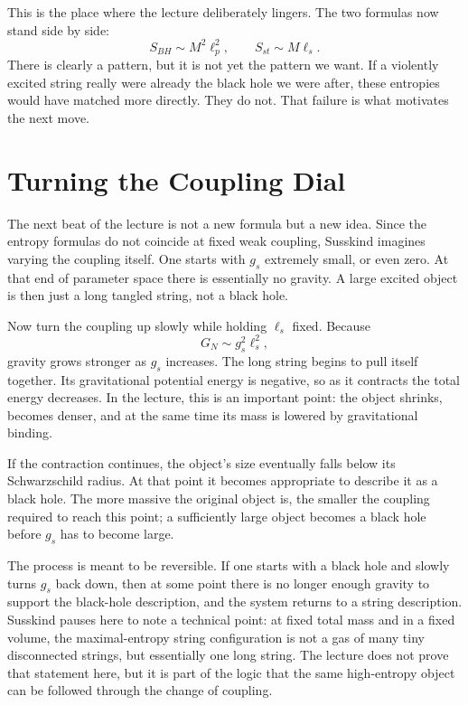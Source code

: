 This is the place where the lecture deliberately lingers. The two formulas now stand side by side:
\begin{equation}
S_{BH}\sim M^2\ell_p^2,
\qquad
S_{st}\sim M\ell_s.
\end{equation}
There is clearly a pattern, but it is not yet the pattern we want. If a violently excited string really were already the black hole we were after, these entropies would have matched more directly. They do not. That failure is what motivates the next move.

\section{Turning the Coupling Dial}

The next beat of the lecture is not a new formula but a new idea. Since the entropy formulas do not coincide at fixed weak coupling, Susskind imagines varying the coupling itself. One starts with \(g_s\) extremely small, or even zero. At that end of parameter space there is essentially no gravity. A large excited object is then just a long tangled string, not a black hole.

Now turn the coupling up slowly while holding \(\ell_s\) fixed. Because
\begin{equation}
G_N\sim g_s^2\ell_s^2,
\end{equation}
gravity grows stronger as \(g_s\) increases. The long string begins to pull itself together. Its gravitational potential energy is negative, so as it contracts the total energy decreases. In the lecture, this is an important point: the object shrinks, becomes denser, and at the same time its mass is lowered by gravitational binding.

If the contraction continues, the object's size eventually falls below its Schwarzschild radius. At that point it becomes appropriate to describe it as a black hole. The more massive the original object is, the smaller the coupling required to reach this point; a sufficiently large object becomes a black hole before \(g_s\) has to become large.

The process is meant to be reversible. If one starts with a black hole and slowly turns \(g_s\) back down, then at some point there is no longer enough gravity to support the black-hole description, and the system returns to a string description. Susskind pauses here to note a technical point: at fixed total mass and in a fixed volume, the maximal-entropy string configuration is not a gas of many tiny disconnected strings, but essentially one long string. The lecture does not prove that statement here, but it is part of the logic that the same high-entropy object can be followed through the change of coupling.


